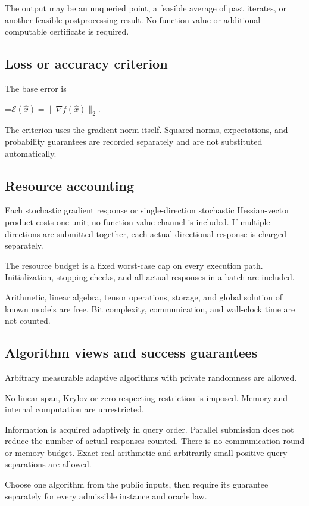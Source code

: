 \documentclass[10pt,a4paper]{article}
\newcommand{\AtlasMath}[1]{\par\begingroup\centering\setbox0=\hbox{$\displaystyle #1$}\ifdim\wd0>1.4\linewidth\typeout{ATLAS WIDE FORMULA: \the\wd0}\fi\ifdim\wd0>\linewidth\resizebox{\linewidth}{!}{\box0}\else\box0\fi\par\endgroup}
\begin{document}
The output may be an unqueried point, a feasible average of past iterates, or another feasible postprocessing result. No function value or additional computable certificate is required.

\subsection{Loss or accuracy criterion}
The base error is


\AtlasMath{\mathcal{E}(\widehat{x})=\|\nabla f(\widehat{x})\|_2.}


The criterion uses the gradient norm itself. Squared norms, expectations, and probability guarantees are recorded separately and are not substituted automatically.

\subsection{Resource accounting}
Each stochastic gradient response or single-direction stochastic Hessian-vector product costs one unit; no function-value channel is included. If multiple directions are submitted together, each actual directional response is charged separately.

The resource budget is a fixed worst-case cap on every execution path. Initialization, stopping checks, and all actual responses in a batch are included.

Arithmetic, linear algebra, tensor operations, storage, and global solution of known models are free. Bit complexity, communication, and wall-clock time are not counted.

\subsection{Algorithm views and success guarantees}
Arbitrary measurable adaptive algorithms with private randomness are allowed.

No linear-span, Krylov or zero-respecting restriction is imposed. Memory and internal computation are unrestricted.

Information is acquired adaptively in query order. Parallel submission does not reduce the number of actual responses counted. There is no communication-round or memory budget. Exact real arithmetic and arbitrarily small positive query separations are allowed.

Choose one algorithm from the public inputs, then require its guarantee separately for every admissible instance and oracle law.
\end{document}
